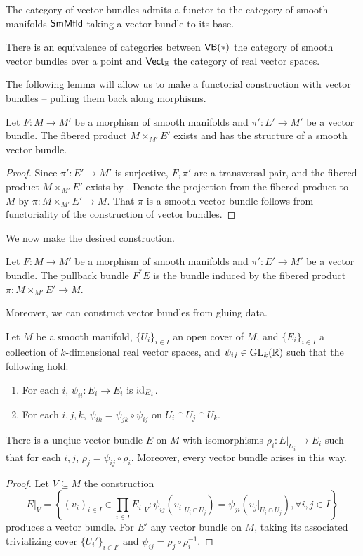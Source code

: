 \begin{remark}
    The category of vector bundles admits a functor to the category of smooth manifolds $\mathsf{SmMfld}$ taking a vector bundle to its base. 
\end{remark}
\begin{remark}
    There is an equivalence of categories between $\mathsf{VB}(*)$ the category of smooth vector bundles over a point and $\mathsf{Vect}_{\mathbb{R}}$ the category of real vector spaces. 
\end{remark}
The following lemma will allow us to make a functorial construction with vector bundles -- pulling them back along morphisms. 
\begin{lemma}\label{lem: pullbacks of vector bundles exist}
    Let $F:M\to M'$ be a morphism of smooth manifolds and $\pi':E'\to M'$ be a vector bundle. The fibered product $M\times_{M'}E'$ exists and has the structure of a smooth vector bundle. 
\end{lemma}
\begin{proof}
   Since $\pi':E'\to M'$ is surjective, $F, \pi'$ are a transversal pair, and the fibered product $M\times_{M'}E'$ exists by . Denote the projection from the fibered product to $M$ by $\pi:M\times_{M'}E'\to M$. That $\pi$ is a smooth vector bundle follows from functoriality of the construction of vector bundles. 
\end{proof}
We now make the desired construction. 
\begin{definition}\label{def: pullback of vector bundles}
    Let $F:M\to M'$ be a morphism of smooth manifolds and $\pi':E'\to M'$ be a vector bundle. The pullback bundle $F^{*}E$ is the bundle induced by the fibered product $\pi:M\times_{M'}E'\to M$. 
\end{definition}
Moreover, we can construct vector bundles from gluing data. 
\begin{lemma}
    Let $M$ be a smooth manifold, $\{U_{i}\}_{i\in I}$ an open cover of $M$, and $\{E_{i}\}_{i\in I}$ a collection of $k$-dimensional real vector spaces, and $\psi_{ij}\in\mathrm{GL}_{k}(\mathbb{R})$ such that the following hold:
    \begin{enumerate}[label=(\arabic*)]
        \item For each $i$, $\psi_{ii}:E_{i}\to E_{i}$ is $\mathrm{id}_{E_{i}}$. 
        \item For each $i,j,k$, $\psi_{ik}=\psi_{jk}\circ\psi_{ij}$ on $U_{i}\cap U_{j}\cap U_{k}$. 
    \end{enumerate}
   There is a unqiue vector bundle $E$ on $M$ with isomorphisms $\rho_{i}:E|_{U_{i}}\to E_{i}$ such that for each $i,j$, $\rho_{j}=\psi_{ij}\circ\rho_{i}$. Moreover, every vector bundle arises in this way. 
\end{lemma}
\begin{proof}
    Let $V\subseteq M$ the construction
    $$E|_{V}=\left\{(v_{i})_{i\in I}\in\prod_{i\in I}E_{i}|_{V}:\psi_{ij}(v_{i}|_{U_{i}\cap U_{j}})=\psi_{ji}(v_{j}|_{U_{i}\cap U_{j}}), \forall i,j\in I\right\}$$
    produces a vector bundle. For $E'$ any vector bundle on $M$, taking its associated trivializing cover $\{U_{i}'\}_{i\in I'}$ and $\psi_{ij}=\rho_{j}\circ\rho_{i}^{-1}$.  
\end{proof}